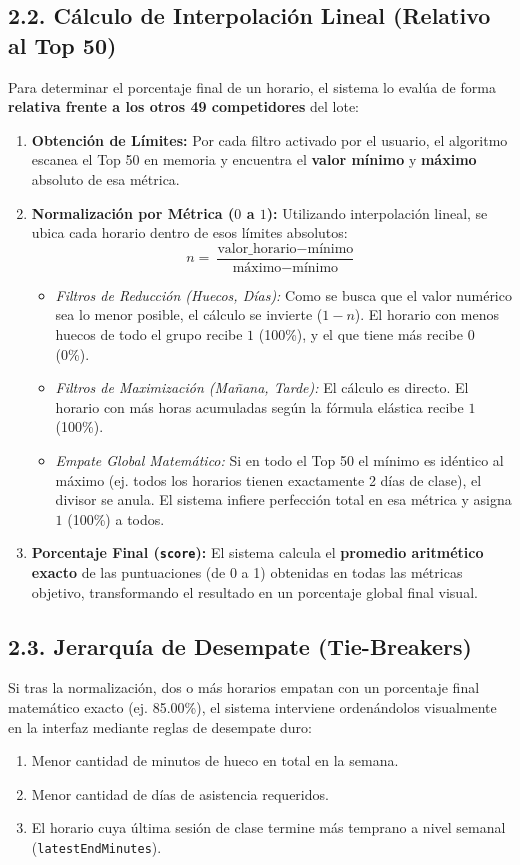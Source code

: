 \documentclass[12pt,a4paper]{article}
\begin{document}
\subsection{2.2. Cálculo de Interpolación Lineal (Relativo al Top 50)}
Para determinar el porcentaje final de un horario, el sistema lo evalúa de forma \textbf{relativa frente a los otros 49 competidores} del lote:

\begin{enumerate}
    \item \textbf{Obtención de Límites:} Por cada filtro activado por el usuario, el algoritmo escanea el Top 50 en memoria y encuentra el \textbf{valor mínimo} y \textbf{máximo} absoluto de esa métrica.
    \item \textbf{Normalización por Métrica ($0$ a $1$):} Utilizando interpolación lineal, se ubica cada horario dentro de esos límites absolutos:
    \begin{equation}
        n = \frac{\text{valor\_horario} - \text{mínimo}}{\text{máximo} - \text{mínimo}}
    \end{equation}
    \begin{itemize}
        \item \textit{Filtros de Reducción (Huecos, Días):} Como se busca que el valor numérico sea lo menor posible, el cálculo se invierte ($1 - n$). El horario con menos huecos de todo el grupo recibe $1$ (100\%), y el que tiene más recibe $0$ (0\%).
        \item \textit{Filtros de Maximización (Mañana, Tarde):} El cálculo es directo. El horario con más horas acumuladas según la fórmula elástica recibe $1$ (100\%).
        \item \textit{Empate Global Matemático:} Si en todo el Top 50 el mínimo es idéntico al máximo (ej. todos los horarios tienen exactamente 2 días de clase), el divisor se anula. El sistema infiere perfección total en esa métrica y asigna $1$ (100\%) a todos.
    \end{itemize}
    \item \textbf{Porcentaje Final (\texttt{score}):} El sistema calcula el \textbf{promedio aritmético exacto} de las puntuaciones (de 0 a 1) obtenidas en todas las métricas objetivo, transformando el resultado en un porcentaje global final visual.
\end{enumerate}

\subsection{2.3. Jerarquía de Desempate (Tie-Breakers)}
Si tras la normalización, dos o más horarios empatan con un porcentaje final matemático exacto (ej. 85.00\%), el sistema interviene ordenándolos visualmente en la interfaz mediante reglas de desempate duro:
\begin{enumerate}
    \item Menor cantidad de minutos de hueco en total en la semana.
    \item Menor cantidad de días de asistencia requeridos.
    \item El horario cuya última sesión de clase termine más temprano a nivel semanal (\texttt{latestEndMinutes}).
\end{enumerate}
\end{document}
